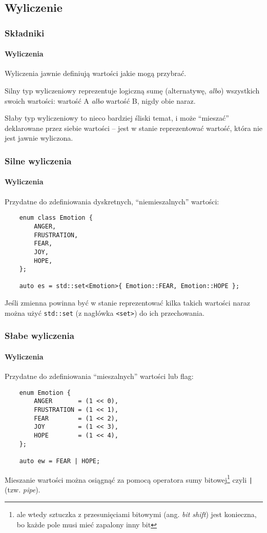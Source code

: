 \documentclass[aspectratio=169,10pt]{beamer}
\begin{document}
\subsection{Wyliczenie}

\begin{frame}
    \frametitle{Składniki}
    \framesubtitle{Wyliczenia}

    Wyliczenia jawnie definiują wartości jakie mogą przybrać.

    Silny typ wyliczeniowy reprezentuje logiczną sumę (alternatywę, \emph{albo}) wszystkich
    swoich wartości: wartość A \emph{albo} wartość B, nigdy obie naraz.

    Słaby typ wyliczeniowy to nieco bardziej śliski temat, i może ``mieszać''
    deklarowane przez siebie wartości -- jest w stanie reprezentować wartość,
    która nie jest jawnie wyliczona.
\end{frame}

\begin{frame}[fragile]
    \frametitle{Silne wyliczenia}
    \framesubtitle{Wyliczenia}

    Przydatne do zdefiniowania dyskretnych, ``niemieszalnych'' wartości:

    {\scriptsize
    \begin{lstlisting}
    enum class Emotion {
        ANGER,
        FRUSTRATION,
        FEAR,
        JOY,
        HOPE,
    };

    auto es = std::set<Emotion>{ Emotion::FEAR, Emotion::HOPE };
    \end{lstlisting}}

    Jeśli zmienna powinna być w stanie reprezentować kilka takich wartości naraz
    można użyć \texttt{std::set} (z nagłówka \texttt{<set>}) do ich przechowania.
\end{frame}

\begin{frame}[fragile]
    \frametitle{Słabe wyliczenia}
    \framesubtitle{Wyliczenia}

    Przydatne do zdefiniowania ``mieszalnych'' wartości lub flag:

    {\scriptsize
    \begin{lstlisting}
    enum Emotion {
        ANGER       = (1 << 0),
        FRUSTRATION = (1 << 1),
        FEAR        = (1 << 2),
        JOY         = (1 << 3),
        HOPE        = (1 << 4),
    };

    auto ew = FEAR | HOPE;
    \end{lstlisting}}

    Mieszanie wartości można osiągnąć za pomocą operatora sumy
    bitowej\footnote{ale wtedy sztuczka z przesunięciami bitowymi (ang.
    \emph{bit shift}) jest konieczna, bo każde pole musi mieć zapalony inny bit}
    czyli \texttt{|} (tzw. \emph{pipe}).
\end{frame}
\end{document}
